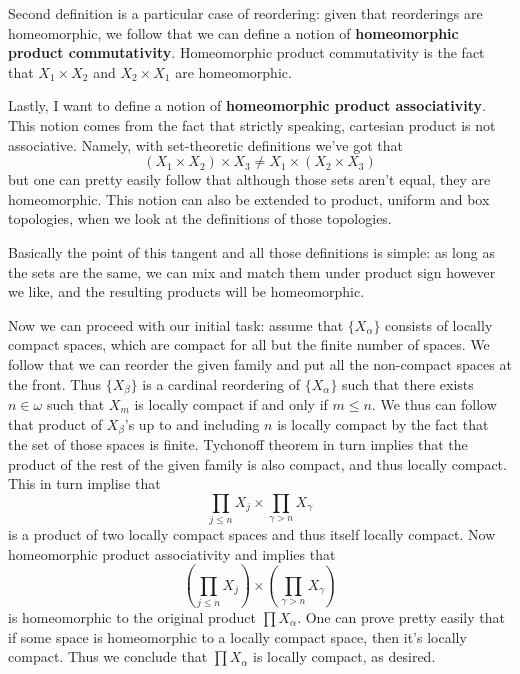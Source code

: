 \documentclass[11pt,oneside,titlepage]{book}
\newcommand{\set}[1]{\{ #1 \}}
\begin{document}
Second definition is a particular case of reordering: given that reorderings are
homeomorphic, we follow that we can define a notion of \textbf{homeomorphic product commutativity}.
Homeomorphic product commutativity is the fact that $X_1 \times X_2$ and $X_2 \times X_1$
are homeomorphic.

Lastly, I want to define a notion of \textbf{homeomorphic product associativity}. This
notion comes from the fact that strictly speaking, cartesian product is not associative.
Namely, with set-theoretic definitions we've got that 
$$(X_1 \times X_2) \times X_3 \neq X_1 \times (X_2 \times X_3)$$
but one can pretty easily follow that although those sets aren't equal, they are homeomorphic.
This notion can also be extended to product, uniform and box topologies, when we look
at the definitions of those topologies.

Basically the point of this tangent and all those definitions is simple: as long as the sets
are the same, we can mix and match them under product sign however we like, and the resulting
products will be homeomorphic.

Now we can proceed with our initial task: assume that $\set{X_\alpha}$ consists
of locally compact spaces, which are compact for all but the finite number of spaces.
We follow that we can reorder the given family and put all the non-compact spaces at the front.
Thus $\set{X_\beta}$ is a cardinal reordering of $\set{X_\alpha}$ such that there exists
$n \in \omega$ such that $X_m$ is locally compact if and only if $m \leq n$. We thus
can follow that product of $X_\beta$'s up to and including $n$ is locally compact by
the fact that the set of those spaces is finite. Tychonoff theorem in turn implies that
the product of the rest of the given family is also compact, and thus locally compact. This
in turn implise that
$$\prod_{j \leq n}{X_j} \times \prod_{\gamma > n}{X_\gamma}$$
is a product of two locally compact spaces and thus itself locally compact. 
Now homeomorphic product associativity and  implies that
$$\left(\prod_{j \leq n}{X_j}\right) \times \left(\prod_{\gamma > n}{X_\gamma}\right)$$
is homeomorphic to the original product $\prod{X_\alpha}$. One can prove pretty easily that
if some space is homeomorphic to a locally compact space, then it's locally compact. Thus
we conclude that $\prod{X_\alpha}$ is locally compact, as desired.

\subsection{}
\end{document}
